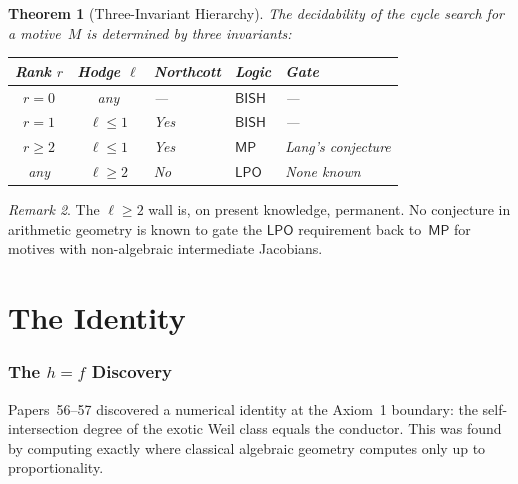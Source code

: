 \documentclass[11pt]{article}
\theoremstyle{plain}
\newtheorem{theorem}{Theorem}[section]
\theoremstyle{definition}
\theoremstyle{remark}
\newtheorem{remark}[theorem]{Remark}
\newcommand{\BISH}{\mathsf{BISH}}
\newcommand{\LPO}{\mathsf{LPO}}
\newcommand{\MP}{\mathsf{MP}}
\begin{document}
\begin{theorem}[Three-Invariant Hierarchy]\label{thm:three}
The decidability of the cycle search for a motive~$M$ is
determined by three invariants:

\medskip
\begin{center}
\renewcommand{\arraystretch}{1.15}
\begin{tabular}{@{}cclll@{}}
\toprule
\textbf{Rank $r$} & \textbf{Hodge $\ell$} &
  \textbf{Northcott} & \textbf{Logic} & \textbf{Gate} \\
\midrule
$r = 0$ & any & --- & $\BISH$ & --- \\
$r = 1$ & $\ell \le 1$ & Yes & $\BISH$ & --- \\
$r \ge 2$ & $\ell \le 1$ & Yes & $\MP$ & Lang's conjecture \\
any & $\ell \ge 2$ & No & $\LPO$ & None known \\
\bottomrule
\end{tabular}
\end{center}
\end{theorem}

\begin{remark}
The $\ell \ge 2$ wall is, on present knowledge, permanent.  No
conjecture in arithmetic geometry is known to gate the
$\LPO$ requirement back to~$\MP$ for motives with
non-algebraic intermediate Jacobians.
\end{remark}



\part{The Identity}\label{part:identity}

\section{The $h = f$ Discovery}\label{sec:hf}

Papers~56--57 \cite{Paper56, Paper57} discovered a numerical
identity at the Axiom~1 boundary: the self-intersection degree of
the exotic Weil class equals the conductor.  This was found by
computing exactly where classical algebraic geometry computes only
up to proportionality.
\end{document}
